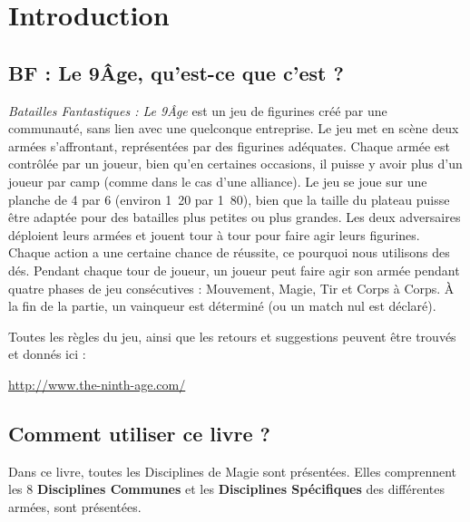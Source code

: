 \documentclass[a4paper,8pt]{extarticle}
\newcommand{\pied}{\arcminute}
\begin{document}


\newpage

{
\Large
\tableofcontents
}
\newpage

{\large
\section{Introduction}

\subsection{BF : Le 9\ieme Âge, qu'est-ce que c'est ?}

\emph{Batailles Fantastiques : Le 9\ieme Âge} est un jeu de figurines créé par une communauté, sans lien avec une quelconque entreprise. Le jeu met en scène deux armées s'affrontant, représentées par des figurines adéquates. Chaque armée est contrôlée par un joueur, bien qu'en certaines occasions, il puisse y avoir plus d'un joueur par camp (comme dans le cas d'une alliance). Le jeu se joue sur une planche de \unit{4}{\pied} par \unit{6}{\pied} (environ \unit{1.20}{\meter} par \unit{1.80}{\meter}), bien que la taille du plateau puisse être adaptée pour des batailles plus petites ou plus grandes. Les deux adversaires déploient leurs armées et jouent tour à tour pour faire agir leurs figurines. Chaque action a une certaine chance de réussite, ce pourquoi nous utilisons des dés. Pendant chaque tour de joueur, un joueur peut faire agir son armée pendant quatre phases de jeu consécutives : Mouvement, Magie, Tir et Corps à Corps. À la fin de la partie, un vainqueur est déterminé (ou un match nul est déclaré).

Toutes les règles du jeu, ainsi que les retours et suggestions peuvent être trouvés et donnés ici :
\begin{center}
\url{http://www.the-ninth-age.com/}
\end{center}

\subsection{Comment utiliser ce livre ?}

Dans ce livre, toutes les Disciplines de Magie sont présentées. Elles comprennent les 8 \textbf{Disciplines Communes} et les \textbf{Disciplines Spécifiques} des différentes armées, sont présentées.

}
\end{document}
